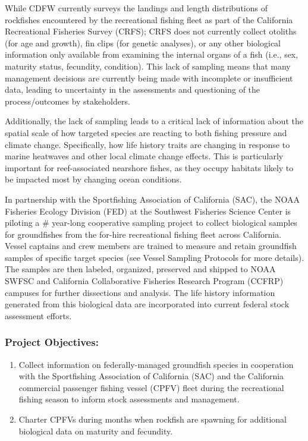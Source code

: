 \documentclass[
  letterpaper,
  DIV=11,
  numbers=noendperiod]{scrartcl}
\begin{document}
While CDFW currently surveys the landings and length distributions of
rockfishes encountered by the recreational fishing fleet as part of the
California Recreational Fisheries Survey (CRFS); CRFS does not currently
collect otoliths (for age and growth), fin clips (for genetic analyses),
or any other biological information only available from examining the
internal organs of a fish (i.e., sex, maturity status, fecundity,
condition). This lack of sampling means that many management decisions
are currently being made with incomplete or insufficient data, leading
to uncertainty in the assessments and questioning of the
process/outcomes by stakeholders.~

Additionally, the lack of sampling leads to a critical lack of
information about the spatial scale of how targeted species are reacting
to both fishing pressure and climate change. Specifically, how life
history traits are changing in response to marine heatwaves and other
local climate change effects. This is particularly important for
reef-associated nearshore fishes, as they occupy habitats likely to be
impacted most by changing ocean conditions.

In partnership with the Sportfishing Association of California (SAC),
the NOAA Fisheries Ecology Division (FED) at the Southwest Fisheries
Science Center is piloting a \# year-long cooperative sampling project
to collect biological samples for groundfishes from the for-hire
recreational fishing fleet across California. Vessel captains and crew
members are trained to measure and retain groundfish samples of specific
target species (see Vessel Sampling Protocols for more details). The
samples are then labeled, organized, preserved and shipped to NOAA SWFSC
and California Collaborative Fisheries Research Program (CCFRP) campuses
for further dissections and analysis. The life history information
generated from this biological data are incorporated into current
federal stock assessment efforts.

\hypertarget{project-objectives}{%
\subsubsection{Project Objectives:}\label{project-objectives}}

\begin{enumerate}
\def\labelenumi{\arabic{enumi}.}
\item
  Collect information on federally-managed groundfish species in
  cooperation with the Sportfishing Association of California (SAC) and
  the California commercial passenger fishing vessel (CPFV) fleet during
  the recreational fishing season to inform stock assessments and
  management.
\item
  Charter CPFVs during months when rockfish are spawning for additional
  biological data on maturity and fecundity.
\end{enumerate}
\end{document}
